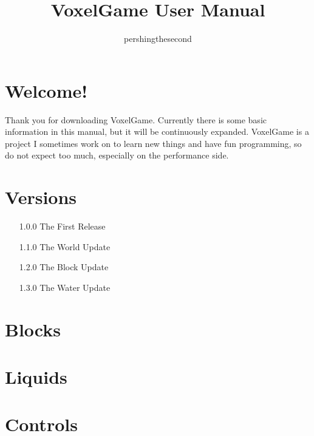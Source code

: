 \documentclass{article}
\begin{document}
    \title{VoxelGame User Manual}
    \author{pershingthesecond}

    \maketitle
    \newpage

    \tableofcontents
    \newpage


    \section{Welcome!}\label{sec:welcome!}

    Thank you for downloading VoxelGame.
    Currently there is some basic information in this manual, but it will be continuously expanded.
    VoxelGame is a project I sometimes work on to learn new things and have fun programming, so do not expect too much, especially on the performance side.


    \section{Versions}\label{sec:versions}

    \begin{enumerate}
        \item[1.0.0] The First Release
        \item[1.1.0] The World Update
        \item[1.2.0] The Block Update
        \item[1.3.0] The Water Update
    \end{enumerate}


    \section{Blocks}\label{sec:blocks}

    


    \section{Liquids}\label{sec:liquids}

    


    \section{Controls}\label{sec:controls}

    
\end{document}
